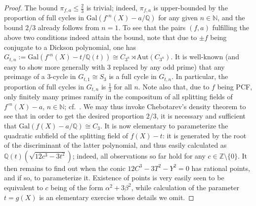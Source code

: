 \documentclass[a4paper]{amsart}
\begin{document}
  \begin{proof}
  The bound $\pi_{f,a}\le \frac{2}{3}$ is trivial; indeed, $\pi_{f,a}$ is upper-bounded by the proportion of full cycles in $\textrm{Gal}(f^{\circ n}(X)-a/\mathbb{Q})$ for any given $n\in \mathbb{N}$, and the bound $2/3$ already follows from $n=1$.
  To see that the pairs $(f,a)$ fulfilling the above two conditions indeed attain the bound, note that due to $\pm f$ being conjugate to a Dickson  polynomial, one has $G_{t,n}:=\textrm{Gal}(f^{\circ n}(X)-t/\mathbb{Q}(t)) \cong C_{3^n}\rtimes \textrm{Aut}(C_{3^n})$. It is well-known  (and easy to show more generally with $3$ replaced by any odd prime) that any preimage of a $3$-cycle in $G_{t,1}\cong S_3$ is a full cycle in $G_{t,n}$. In particular, the proportion of full cycles in $G_{t,n}$ is $\frac{1}{3}$ for all $n$. Note also that, due to $f$ being PCF, only finitely many primes ramify in the compositum of all splitting fields of $f^{\circ n}(X)-a$, $n\in \mathbb{N}$; cf.\ \cite{Betal}. We may thus invoke Chebotarev's density theorem to see that in order to get the desired proportion $2/3$, it is necessary and sufficient that $\textrm{Gal}(f(X)-a/\mathbb{Q})\cong C_3$. It is now elementary to parameterize the quadratic subfield of the splitting field of $f(X)-t$:
  it is generated by the root of the discriminant of the latter polynomial, and thus easily calculated as $\mathbb{Q}(t)(\sqrt{12c^3-3t^2})$; indeed, all observations so far hold for any $c\in \mathbb{Z}\setminus\{0\}$. It then remains to find out when the conic $12C^3-3T^2-Y^2=0$ has rational points, and if so, to parameterize it. Existence of points is very easily seen to be equivalent to $c$ being of the form $\alpha^2+3\beta^2$, while calculation of the parameter $t=g(X)$ is an elementary exercise whose details we omit.


\end{proof}
\end{document}
